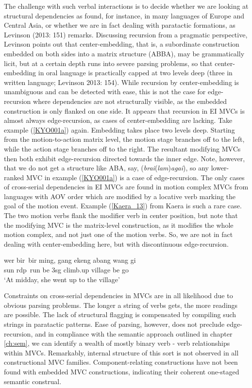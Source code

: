 The challenge with such verbal interactions is to decide whether we are looking at structural dependencies as found, for instance, in many languages of Europe and Central Asia, or whether we are in fact dealing with paratactic formations, as Levinson (2013: 151) remarks. Discussing recursion from a pragmatic perspective, Levinson points out that center-embedding, that is, a subordinate construction embedded on both sides into a matrix structure (ABBA), may be grammatically licit, but at a certain depth runs into severe parsing problems, so that center-embedding in oral language is practically capped at two levels deep (three in written language; Levinson 2013: 154). While recursion by center-embedding is unambiguous and can be detected with ease, this is not the case for edge-recursion where dependencies are not structurally visible, as the embedded construction is only flanked on one side. It appears that recursion in EI MVCs is almost always edge-recursion, as cases of center-embedding are lacking. Take example (\ref{KYO001a}) again. Embedding takes place two levels deep. Starting from the motion-to-action matrix level, the motion stage branches off to the left, while the action stage branches off to the right. The resultant modifying MVCs then both exhibit edge-recursion directed towards the inner edge. Note, however, that we do not get a structure like ABA, say, (\textit{brai}(\textit{lam})\textit{agai}), so any lower-ranked MVC in example (\ref{KYO001a}) is a case of edge-recursion. The only cases of cross-serial dependencies in EI MVCs are found in motion complex MVCs from languages with AOV order which are modified by a locative verb marking the goal of the motion event. Example (\ref{Kaera_13}) from Kaera is such a rare case. The two motion verbs flank the modifier verb in center position, but note that the modifying MVC is the matrix-level construction, as it modifies the whole motion complex, and not just one of the motion verbs. So, we are not in fact dealing with center-embedding here, but with discontinuous edge-recursion.

\ea \label{Kaera_13}
\gll wer bir~bir ming, gang ekeng abang wang gi \\
sun \acs{rdp}~run be 3\acs{sg} climb.up village be go \\
\glft `At midday, she went up to the village' \\ 
\z
\xe

Constraints on cross-serial dependencies in MVCs are in all likelihood due to obvious parsing problems. The longer a string of verbs gets, the more readings are possible. The lack of structural flagging is compensated by compiling such strings in paratactic patterns. Ease of parsing, however, does not preclude edge-recursion, and in compliance with the semantic approach outlined in chapter \ref{ch:sem}, we can identify a wealth of mostly binary verb - verb relationships within MVCs. Remarkably, internal structure of this sort is not observed in all constructional MVC families. Component-relating constructions have not been found with embedded MVC constructions, indicating their coherent one-staged semantic construal.

